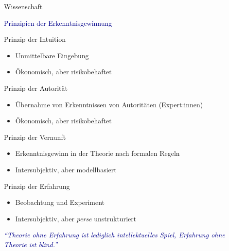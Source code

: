 \documentclass[
  8pt,
  ignorenonframetext,
]{beamer}
\providecommand{\tightlist}{%
  \setlength{\itemsep}{0pt}\setlength{\parskip}{0pt}}
\begin{document}
\begin{frame}{Wissenschaft}
\protect\hypertarget{wissenschaft-2}{}

\textcolor{darkblue}{Prinzipien der Erkenntnisgewinnung} \small

Prinzip der Intuition

\begin{itemize}
\tightlist
\item
  Unmittelbare Eingebung
\item
  Ökonomisch, aber risikobehaftet
\end{itemize}

Prinzip der Autorität

\begin{itemize}
\tightlist
\item
  Übernahme von Erkenntnissen von Autoritäten (Expert:innen)
\item
  Ökonomisch, aber risikobehaftet
\end{itemize}

Prinzip der Vernunft

\begin{itemize}
\tightlist
\item
  Erkenntnisgewinn in der Theorie nach formalen Regeln
\item
  Intersubjektiv, aber modellbasiert
\end{itemize}

Prinzip der Erfahrung

\begin{itemize}
\tightlist
\item
  Beobachtung und Experiment
\item
  Intersubjektiv, aber \emph{perse} unstrukturiert
\end{itemize}

\vspace{1mm}
\center

\textit{\textcolor{darkblue}{``Theorie ohne Erfahrung ist lediglich intellektuelles Spiel, Erfahrung ohne Theorie ist blind.''}}

\flushright{\textit{\textcolor{darkblue}{nach Immanuel Kant (vielleicht)}}}
\end{frame}
\end{document}
